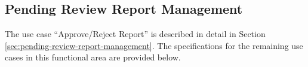 \subsection{Pending Review Report Management}

The use case ``Approve/Reject Report'' is described in detail in Section \ref{sec:pending-review-report-management}. The specifications for the remaining use cases in this functional area are provided below.



